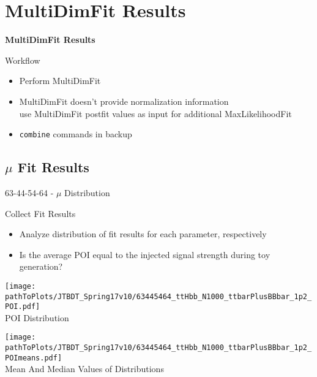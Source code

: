 \section{MultiDimFit Results}
\begin{frame}
\centering
\textbf{\huge{MultiDimFit Results}}
\end{frame}

\begin{frame}{Workflow}

\begin{itemize}
\item Perform MultiDimFit
\item MultiDimFit doesn't provide normalization information\\
\rar use MultiDimFit postfit values as input for additional MaxLikelihoodFit
\item \texttt{combine} commands in backup
\end{itemize}

\end{frame}

\subsection{$\mu$ Fit Results}
\begin{frame}{63-44-54-64 - $\mu$ Distribution}


\begin{block}{Collect Fit Results}
\begin{itemize}
\item Analyze distribution of fit results for each parameter, respectively
\item Is the average POI equal to the injected signal strength during toy generation? 
\end{itemize}
\end{block}

\vskip -0.15cm
\begin{minipage}{0.55\textwidth}
\begin{center}
\texttt{[image: \\pathToPlots/JTBDT\_Spring17v10/63445464\_ttHbb\_N1000\_ttbarPlusBBbar\_1p2\_POI.pdf]}\\
POI Distribution
\end{center}


\end{minipage}
\hfill
\begin{minipage}{0.4\textwidth}
\begin{center}
\texttt{[image: \\pathToPlots/JTBDT\_Spring17v10/63445464\_ttHbb\_N1000\_ttbarPlusBBbar\_1p2\_POImeans.pdf]}\\
Mean And Median Values of Distributions
\end{center}



\end{minipage}



\end{frame}

